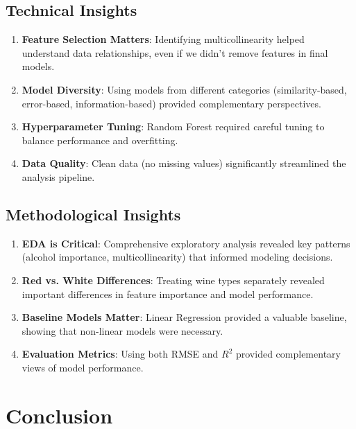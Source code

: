 \documentclass[12pt]{article}
\begin{document}
\subsection{Technical Insights}
\begin{enumerate}
    \item \textbf{Feature Selection Matters}: Identifying multicollinearity helped understand data relationships, even if we didn't remove features in final models.
    
    \item \textbf{Model Diversity}: Using models from different categories (similarity-based, error-based, information-based) provided complementary perspectives.
    
    \item \textbf{Hyperparameter Tuning}: Random Forest required careful tuning to balance performance and overfitting.
    
    \item \textbf{Data Quality}: Clean data (no missing values) significantly streamlined the analysis pipeline.
\end{enumerate}

\subsection{Methodological Insights}
\begin{enumerate}
    \item \textbf{EDA is Critical}: Comprehensive exploratory analysis revealed key patterns (alcohol importance, multicollinearity) that informed modeling decisions.
    
    \item \textbf{Red vs. White Differences}: Treating wine types separately revealed important differences in feature importance and model performance.
    
    \item \textbf{Baseline Models Matter}: Linear Regression provided a valuable baseline, showing that non-linear models were necessary.
    
    \item \textbf{Evaluation Metrics}: Using both RMSE and $R^2$ provided complementary views of model performance.
\end{enumerate}

\section{Conclusion}
\end{document}
